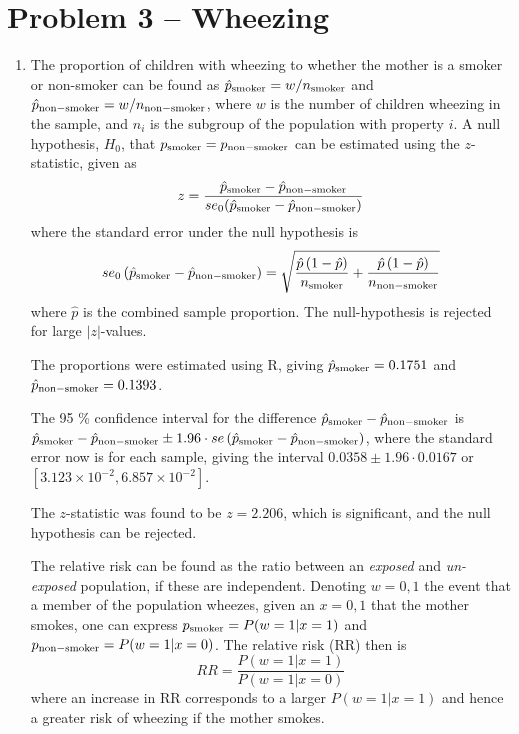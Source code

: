 \documentclass[a4paper,11pt]{article}
\begin{document}
\section*{Problem 3 -- Wheezing}
\begin{enumerate}[label=3\alph*)]
    \item  The proportion of children with wheezing to whether the mother is a smoker or non-smoker can be found as $\hat{p}_{\rm smoker} = w / n_{\rm smoker}$ and  $\hat{p}_{\rm non-smoker} = w / n_{\rm non-smoker}$, where $w$ is the number of children wheezing in the sample, and $n_i$ is the subgroup of the population with property $i$. A null hypothesis, $H_0$, that $p_{\rm smoker} = p_{\rm non-smoker}$ can be estimated using the $z$-statistic, given as
        \begin{equation}
            z = \frac{\hat{p}_{\rm smoker} - \hat{p}_{\rm non-smoker}}{se_0(\hat{p}_{\rm smoker} - \hat{p}_{\rm non-smoker} ) }
            \label{eq:z_statistic}
        \end{equation}
        where the standard error under the null hypothesis is
        \begin{equation}
            se_0 \left( \hat{p}_{\rm smoker} - \hat{p}_{\rm non-smoker} \right) = \sqrt{ \frac{\hat{p} \left( 1 - \hat{p} \right)}{n_{\rm smoker}} + \frac{\hat{p}\left( 1- \hat{p} \right)}{n_{\rm non-smoker}}  }
            \label{eq:se_0}
        \end{equation}
        where $\hat{p}$ is the combined sample proportion. The null-hypothesis is rejected for large $|z|$-values.

        The proportions were estimated using R, giving $\hat{p}_{\rm smoker} = 0.1751$ and $\hat{p}_{\rm non-smoker} = 0.1393$.

        The 95 \% confidence interval for the difference $\hat{p}_{\rm smoker} - \hat{p}_{\rm non-smoker}$ is $\hat{p}_{\rm smoker} - \hat{p}_{\rm non-smoker} \pm 1.96 \cdot se \left( \hat{p}_{\rm smoker} - \hat{p}_{\rm non-smoker} \right)$, where the standard error now is for each sample, giving the interval $0.0358 \pm 1.96 \cdot 0.0167$ or $[3.123 \times 10^{-2}, 6.857 \times 10^{-2}]$.

        The $z$-statistic was found to be $z = 2.206$, which is significant, and the null hypothesis can be rejected.

        The relative risk can be found as the ratio between an \textit{exposed} and \textit{un-exposed} population, if these are independent. Denoting $w = 0,1$ the event that a member of the population wheezes, given an $x = 0,1$ that the mother smokes, one can express $p_{\rm smoker} = P( w=1 | x=1 )$ and $p_{\rm non-smoker} = P( w=1 | x=0)$. The relative risk (RR) then is
        \begin{equation}
            RR = \frac{P\left( w=1 | x=1 \right)}{P\left( w=1 | x=0 \right)}
            \label{eq:RR}
        \end{equation}
        where an increase in RR corresponds to a larger $P(w=1 | x=1)$ and hence a greater risk of wheezing if the mother smokes.


\end{enumerate}
\end{document}

